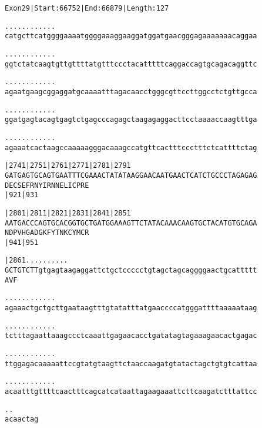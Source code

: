 \documentclass{article}
\begin{document}
\newpage
\begin{alltt}
Exon 29 | Start: 66752 | End: 66879 | Length: 127

.    .    .    .    .    .    .    .    .    .    .    .
catgcttcatggggaaaatggggaaaggaaggatggatgaacgggagaaaaaaacaggaa



.    .    .    .    .    .    .    .    .    .    .    .
ggtctatcaagtgttgttttatgtttccctacatttttcaggaccagtgcagacaggttc



.    .    .    .    .    .    .    .    .    .    .    .
agaatgaagcggaggatgcaaaatttagacaacctgggcgttccttggcctctgttgcca



.    .    .    .    .    .    .    .    .    .    .    .
ggatgagtacagtgagtctgagcccagagctaagagaggacttcctaaaaccaagtttga



.    .    .    .    .    .    .    .    .    .    .    .
agaaatcactaagccaaaaagggacaaagccatgttcactttccctttctcattttctag



 |2741     |2751     |2761     |2771     |2781     |2791
GATGAGTGCAGTGAATTTCGAAACTATATAAGGAACAATGAACTCATCTGCCCTAGAGAG
D  E  C  S  E  F  R  N  Y  I  R  N  N  E  L  I  C  P  R  E
                     |921                          |931

 |2801     |2811     |2821     |2831     |2841     |2851
AATGACCCAGTGCACGGTGCTGATGGAAAGTTCTATACAAACAAGTGCTACATGTGCAGA
N  D  P  V  H  G  A  D  G  K  F  Y  T  N  K  C  Y  M  C  R
                     |941                          |951

 |2861      .    .    .    .    .    .    .    .    .    .
GCTGTCTTgtgagtaagaggattctgctccccctgtagctagcaggggaactgcattttt
A  V  F


\end{alltt}
\newpage
\begin{alltt}
  .    .    .    .    .    .    .    .    .    .    .    .
agaaactgctgcttgaataagtttgtatatttatgaaccccatgggattttaaaaataag



  .    .    .    .    .    .    .    .    .    .    .    .
tctttagaattaaagccctcaaattgagaacacctgatatagtagaaagaacactgagac



  .    .    .    .    .    .    .    .    .    .    .    .
ttggagacaaaaattccgtatgtaagttctaaccaagatgtatactagctgtgtcattaa



  .    .    .    .    .    .    .    .    .    .    .    .
acaatttgttttcaactttcagcatcataattagaagaaattcttcaagatctttattcc



  .    .
acaactag


\end{alltt}
\end{document}
